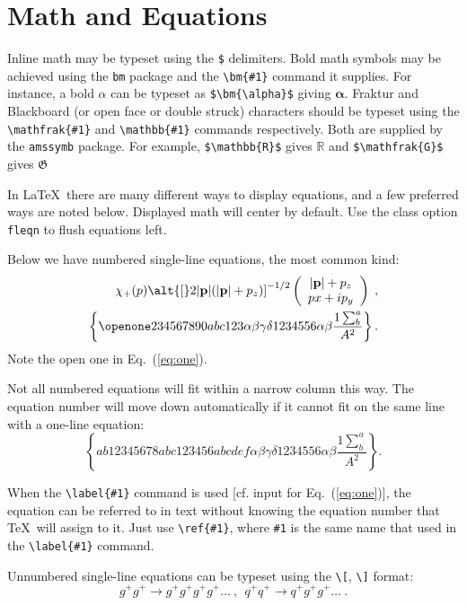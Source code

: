\documentclass[%
 aip,
 jmp,%
 amsmath,amssymb,
 reprint,%
]{revtex4-1}
\begin{document}
\section{Math and Equations}
Inline math may be typeset using the \verb+$+ delimiters. Bold math
symbols may be achieved using the \verb+bm+ package and the
\verb+\bm{#1}+ command it supplies. For instance, a bold $\alpha$ can
be typeset as \verb+$\bm{\alpha}$+ giving $\bm{\alpha}$. Fraktur and
Blackboard (or open face or double struck) characters should be
typeset using the \verb+\mathfrak{#1}+ and \verb+\mathbb{#1}+ commands
respectively. Both are supplied by the \texttt{amssymb} package. For
example, \verb+$\mathbb{R}$+ gives $\mathbb{R}$ and
\verb+$\mathfrak{G}$+ gives $\mathfrak{G}$

In \LaTeX\ there are many different ways to display equations, and a
few preferred ways are noted below. Displayed math will center by
default. Use the class option \verb+fleqn+ to flush equations left.

Below we have numbered single-line equations, the most common kind: 
\begin{eqnarray}
\chi_+(p)\alt{\bf [}2|{\bf p}|(|{\bf p}|+p_z){\bf ]}^{-1/2}
\left(
\begin{array}{c}
|{\bf p}|+p_z\\
px+ip_y
\end{array}\right)\;,
\\
\left\{%
 \openone234567890abc123\alpha\beta\gamma\delta1234556\alpha\beta
 \frac{1\sum^{a}_{b}}{A^2}%
\right\}%
\label{eq:one}.
\end{eqnarray}
Note the open one in Eq.~(\ref{eq:one}).

Not all numbered equations will fit within a narrow column this
way. The equation number will move down automatically if it cannot fit
on the same line with a one-line equation:
\begin{equation}
\left\{
 ab12345678abc123456abcdef\alpha\beta\gamma\delta1234556\alpha\beta
 \frac{1\sum^{a}_{b}}{A^2}%
\right\}.
\end{equation}

When the \verb+\label{#1}+ command is used [cf. input for
Eq.~(\ref{eq:one})], the equation can be referred to in text without
knowing the equation number that \TeX\ will assign to it. Just
use \verb+\ref{#1}+, where \verb+#1+ is the same name that used in
the \verb+\label{#1}+ command.

Unnumbered single-line equations can be typeset
using the \verb+\[+, \verb+\]+ format:
\[g^+g^+ \rightarrow g^+g^+g^+g^+ \dots ~,~~q^+q^+\rightarrow
q^+g^+g^+ \dots ~. \]
\end{document}
